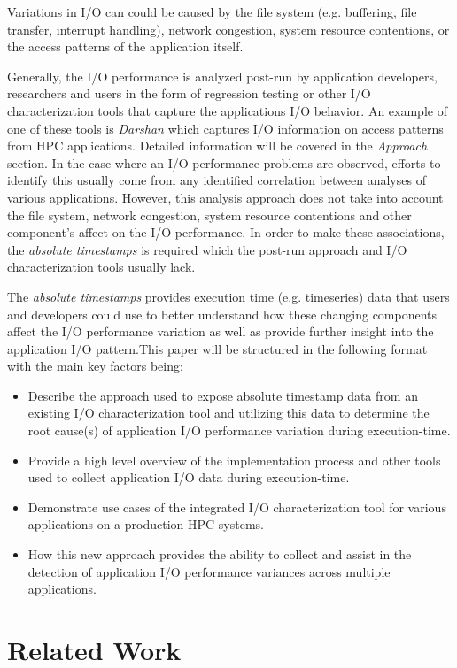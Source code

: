 \documentclass[conference]{IEEEtran}
\begin{document}
Variations in I/O can could be caused by the file system (e.g. buffering, file transfer, interrupt handling), network congestion, system resource contentions, or the access patterns of the application itself.

Generally, the I/O performance is analyzed post-run by application developers, researchers and users in the form of regression testing or other I/O characterization tools that capture the applications I/O behavior. An example of one of these tools is \emph{Darshan} which captures I/O information on access patterns from HPC applications. Detailed information will be covered in the \emph{Approach} section. In the case where an I/O performance problems are observed, efforts to identify this usually come from any identified correlation between analyses of various applications. However, this analysis approach does not take into account the file system, network congestion, system resource contentions and other component's affect on the I/O performance. In order to make these associations, the \emph{absolute timestamps} is required  which the post-run approach and I/O characterization tools usually lack.

The \emph{absolute timestamps} provides execution time (e.g. timeseries) data that users and developers could use to better understand how these changing components affect the I/O performance variation as well as provide further insight into the application I/O pattern.This paper will be structured in the following format with the main key factors being:
\begin{itemize}
    \item Describe the approach used to expose absolute timestamp data from an existing I/O characterization tool and utilizing this data to determine the root cause(s) of application I/O performance variation during execution-time.
    \item Provide a high level overview of the implementation process and other tools used to collect application I/O data during execution-time.
    \item Demonstrate use cases of the integrated I/O characterization tool for various applications on a production HPC systems. 
    \item How this new approach provides the ability to collect and assist in the detection of application I/O performance variances across multiple applications. 
\end{itemize}


\section{Related Work}
\end{document}
